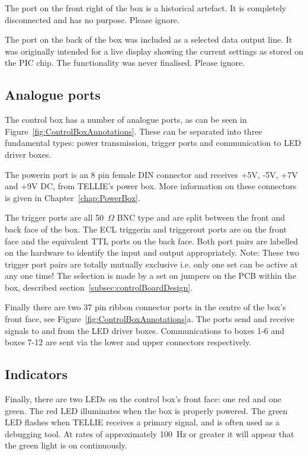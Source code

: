 \documentclass[12pt]{report}
\begin{document}
	The port on the front right of the box is a historical artefact. It is completely disconnected and has no purpose. Please ignore.

	The port on the back of the box was included as a selected data output line. It was originally intended for a live display showing the current settings as stored on the PIC chip. The functionality was never finalised. Please ignore.
	

\subsection{Analogue ports}
The control box has a number of analogue ports, as can be seen in Figure~\ref{fig:ControlBoxAnnotations}. These can be separated into three fundamental types: power transmission, trigger ports and communication to LED driver boxes. 

	The power\textunderscore in port is an 8 pin female DIN connector and receives +5V, -5V, +7V and +9V DC, from TELLIE's power box. More information on these connectors is given in Chapter~\ref{chap:PowerBox}.

	The trigger ports are all 50~$\Omega$ BNC type and are split between the front and back face of the box. The ECL trigger\textunderscore in and trigger\textunderscore out ports are on the front face and the equivalent TTL ports on the back face. Both port pairs are labelled on the hardware to identify the input and output appropriately. Note: These two trigger port pairs are totally mutually exclusive i.e. only one set can be active at any one time! The selection is made by a set on jumpers on the PCB within the box, described section~\ref{subsec:controlBoardDesign}. 

	Finally there are two 37 pin ribbon connector ports in the centre of the box's front face, see Figure~\ref{fig:ControlBoxAnnotations}a. The ports send and receive signals to and from the LED driver boxes. Communications to boxes 1-6 and boxes 7-12 are sent via the lower and upper connectors respectively.  


\subsection{Indicators}

Finally, there are two LEDs on the control box's front face: one red and one green. The red LED illuminates when the box is properly powered. The green LED flashes when TELLIE receives a primary signal, and is often used as a debugging tool. At rates of approximately 100~Hz or greater it will appear that the green light is on continuously. 
\end{document}
